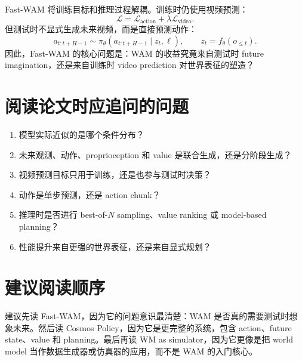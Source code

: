 \documentclass[11pt,a4paper]{ctexart}
\begin{document}
Fast-WAM 将训练目标和推理过程解耦。训练时仍使用视频预测：
\[
  \mathcal{L}
  =
  \mathcal{L}_{\mathrm{action}}
  +
  \lambda\mathcal{L}_{\mathrm{video}}.
\]
但测试时不显式生成未来视频，而是直接预测动作：
\[
  a_{t:t+H-1}\sim \pi_\theta(a_{t:t+H-1}\mid z_t,\ell),
  \qquad z_t=f_\theta(o_{\le t}).
\]
因此，Fast-WAM 的核心问题是：WAM 的收益究竟来自测试时 future imagination，还是来自训练时 video prediction 对世界表征的塑造？

\section{阅读论文时应追问的问题}

\begin{enumerate}
  \item 模型实际近似的是哪个条件分布？
  \item 未来观测、动作、proprioception 和 value 是联合生成，还是分阶段生成？
  \item 视频预测目标只用于训练，还是也参与测试时决策？
  \item 动作是单步预测，还是 action chunk？
  \item 推理时是否进行 best-of-$N$ sampling、value ranking 或 model-based planning？
  \item 性能提升来自更强的世界表征，还是来自显式规划？
\end{enumerate}

\section{建议阅读顺序}

建议先读 Fast-WAM，因为它的问题意识最清楚：WAM 是否真的需要测试时想象未来。然后读 Cosmos Policy，因为它是更完整的系统，包含 action、future state、value 和 planning。最后再读 WM as simulator，因为它更像是把 world model 当作数据生成器或仿真器的应用，而不是 WAM 的入门核心。
\end{document}
